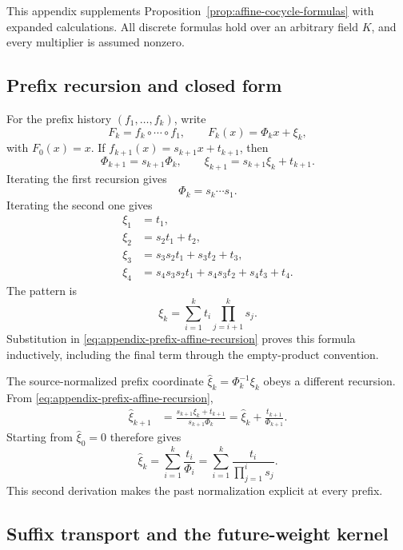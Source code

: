 This appendix supplements Proposition~\ref{prop:affine-cocycle-formulas} with
expanded calculations.  All discrete formulas hold over an arbitrary field
$K$, and every multiplier is assumed nonzero.

\subsection{Prefix recursion and closed form}

For the prefix history $(f_1,\ldots,f_k)$, write
\[
  F_k=f_k\circ\cdots\circ f_1,
  \qquad
  F_k(x)=\Phi_kx+\xi_k,
\]
with $F_0(x)=x$.  If $f_{k+1}(x)=s_{k+1}x+t_{k+1}$, then
\begin{equation}
  \Phi_{k+1}=s_{k+1}\Phi_k,
  \qquad
  \xi_{k+1}=s_{k+1}\xi_k+t_{k+1}.
  \label{eq:appendix-prefix-affine-recursion}
\end{equation}
Iterating the first recursion gives
\[
  \Phi_k=s_k\cdots s_1.
\]
Iterating the second one gives
\begin{align*}
  \xi_1&=t_1,\\
  \xi_2&=s_2t_1+t_2,\\
  \xi_3&=s_3s_2t_1+s_3t_2+t_3,\\
  \xi_4&=s_4s_3s_2t_1+s_4s_3t_2+s_4t_3+t_4.
\end{align*}
The pattern is
\[
  \xi_k=\sum_{i=1}^{k}t_i\prod_{j=i+1}^{k}s_j.
\]
Substitution in \eqref{eq:appendix-prefix-affine-recursion} proves this formula
inductively, including the final term through the empty-product convention.

The source-normalized prefix coordinate
$\widehat\xi_k=\Phi_k^{-1}\xi_k$ obeys a different recursion.  From
\eqref{eq:appendix-prefix-affine-recursion},
\begin{align}
  \widehat\xi_{k+1}
  &=\frac{s_{k+1}\xi_k+t_{k+1}}
          {s_{k+1}\Phi_k}
   =\widehat\xi_k+\frac{t_{k+1}}{\Phi_{k+1}}.
  \label{eq:appendix-normalized-prefix-recursion}
\end{align}
Starting from $\widehat\xi_0=0$ therefore gives
\[
  \widehat\xi_k
  =\sum_{i=1}^{k}\frac{t_i}{\Phi_i}
  =\sum_{i=1}^{k}\frac{t_i}{\prod_{j=1}^{i}s_j}.
\]
This second derivation makes the past normalization explicit at every prefix.

\subsection{Suffix transport and the future-weight kernel}

